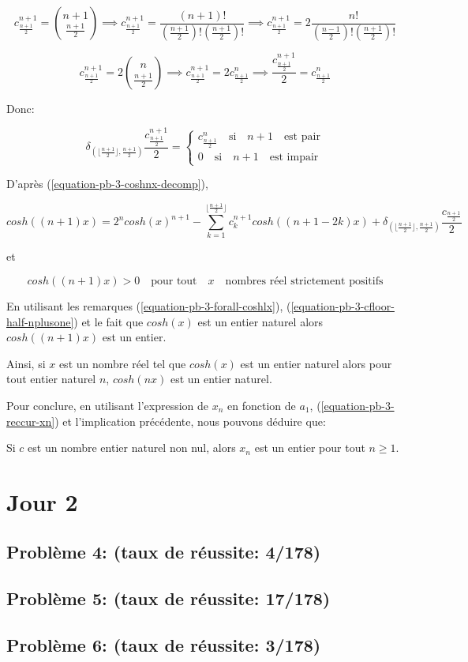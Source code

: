 \documentclass[12pt,a4paper,article]{memoir}
\newcommand{\floor}[1]{\lfloor #1 \rfloor}
\begin{document}
\[c_{\frac{n+1}{2}}^{n+1} = \binom{n+1}{\frac{n+1}{2}} \implies c_{\frac{n+1}{2}}^{n+1} = \frac{(n+1)!}{(\frac{n+1}{2})!(\frac{n+1}{2})!}  \implies c_{\frac{n+1}{2}}^{n+1} = 2 \frac{n!}{(\frac{n-1}{2})!(\frac{n+1}{2})!} \]

\[c_{\frac{n+1}{2}}^{n+1} = 2\binom{n}{\frac{n+1}{2}} \implies c_{\frac{n+1}{2}}^{n+1} = 2c_{\frac{n+1}{2}}^{n} \implies \frac{c_{\frac{n+1}{2}}^{n+1}}{2} = c_{\frac{n+1}{2}}^{n} \]

Donc: 

\begin{equation}
\delta_{(\floor{\frac{n+1}{2}}, \frac{n+1}{2})} \frac{c_{\frac{n+1}{2}}^{n+1}}{2} = \left\{
	\begin{array}{l}
	c_{\frac{n+1}{2}}^{n} \quad \textrm{si} \quad n+1 \quad \textrm{est pair}\\
	0 \quad \textrm{si} \quad n+1 \quad \textrm{est impair}
	\end{array}
\right.
\label{equation-pb-3-cfloor-half-nplusone}
\end{equation}

D'après (\ref{equation-pb-3-coshnx-decomp}),

\[cosh((n+1)x) = 2^{n}cosh(x)^{n+1} - \sum_{k=1}^{\floor{\frac{n+1}{2}}} c_{k}^{n+1} cosh((n+1-2k)x) + \delta_{(\floor{\frac{n+1}{2}}, \frac{n+1}{2})} \frac{c_{\frac{n+1}{2}}}{2}\]

et 

\[cosh((n+1)x) > 0 \quad \textrm{pour tout} \quad x \quad \textrm{nombres réel strictement positifs}\]

En utilisant les remarques (\ref{equation-pb-3-forall-coshlx}), (\ref{equation-pb-3-cfloor-half-nplusone}) et le fait que $cosh(x)$ est un entier naturel alors $cosh((n+1)x)$ est un entier.

\bigskip

Ainsi, si $x$ est un nombre réel tel que $cosh(x)$ est un entier naturel alors pour tout entier naturel $n$, $cosh(nx)$ est un entier naturel.

\bigskip

Pour conclure, en utilisant l'expression de $x_{n}$ en fonction de $a_{1}$, (\ref{equation-pb-3-reccur-xn}) et l'implication précédente, nous pouvons déduire que:

\bigskip

Si $c$ est un nombre entier naturel non nul, alors $x_{n}$ est un entier pour tout $n \geq 1$.
 
\section{Jour 2}
\subsection{Problème 4: (taux de réussite: 4/178)}
\subsection{Problème 5: (taux de réussite: 17/178)}
\subsection{Problème 6: (taux de réussite: 3/178)}
\end{document}
